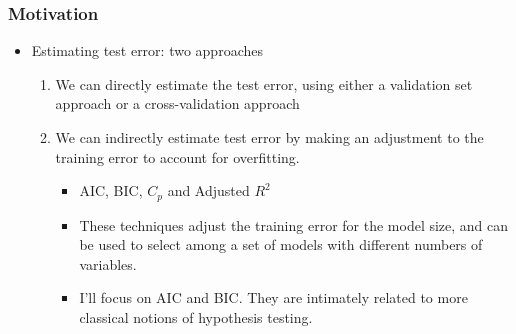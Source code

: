 \documentclass[
  shownotes,
  xcolor={svgnames},
  hyperref={colorlinks,citecolor=DarkBlue,linkcolor=DarkRed,urlcolor=DarkBlue}
  ]{beamer}
\begin{document}
\begin{frame}[fragile]
\frametitle{Motivation}
\begin{itemize}
\item Estimating test error: two approaches
\medskip
\begin{enumerate}
\item We can directly estimate the test error, using either a validation set approach or a cross-validation approach
\medskip
\item We can indirectly estimate test error by making an adjustment to the training error to account for overfitting.
\medskip
\begin{itemize}
  \item AIC, BIC, $C_p$ and Adjusted $R^2$
  \medskip
  \item These techniques adjust the training error for the model size, and can be used to select among a set of models with different numbers of variables.
  \medskip
  \item I'll focus on AIC and BIC. They are intimately related to  more classical notions of hypothesis testing. 
\end{itemize}


\end{enumerate}
\end{itemize}

\end{frame}
\end{document}
